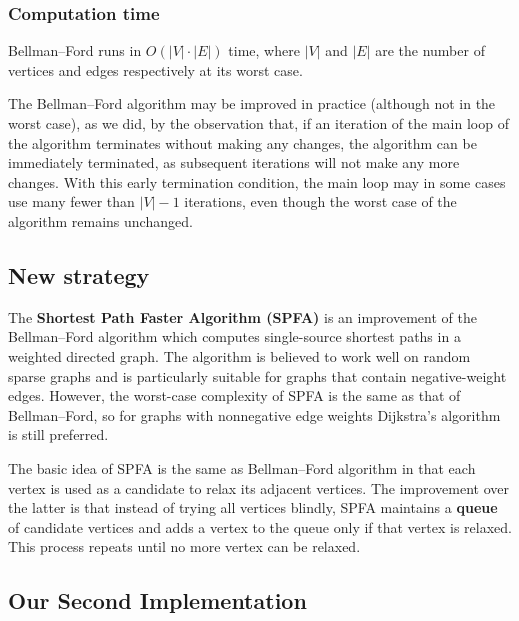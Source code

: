 \documentclass[11pt]{article}
\begin{document}
    \hypertarget{computation-time}{%
\subsubsection{Computation time}\label{computation-time}}

Bellman--Ford runs in \(O(|V|\cdot |E|)\) time, where \(|V|\) and
\(|E|\) are the number of vertices and edges respectively at its worst
case.

    The Bellman--Ford algorithm may be improved in practice (although not in
the worst case), as we did, by the observation that, if an iteration of
the main loop of the algorithm terminates without making any changes,
the algorithm can be immediately terminated, as subsequent iterations
will not make any more changes. With this early termination condition,
the main loop may in some cases use many fewer than $|V|-1$
iterations, even though the worst case of the algorithm remains
unchanged.

    \hypertarget{new-strategy}{%
\subsection{New strategy}\label{new-strategy}}

The \textbf{Shortest Path Faster Algorithm (SPFA)}\cite{SPFA} is an improvement of
the Bellman--Ford algorithm which computes single-source shortest paths
in a weighted directed graph. The algorithm is believed to work well on
random sparse graphs and is particularly suitable for graphs that
contain negative-weight edges. However, the worst-case complexity of
SPFA is the same as that of Bellman--Ford, so for graphs with
nonnegative edge weights Dijkstra's algorithm is still preferred.

    The basic idea of SPFA is the same as Bellman--Ford algorithm in that
each vertex is used as a candidate to relax its adjacent vertices. The
improvement over the latter is that instead of trying all vertices
blindly, SPFA maintains a \textbf{queue} of candidate vertices and adds
a vertex to the queue only if that vertex is relaxed. This process
repeats until no more vertex can be relaxed.

    \hypertarget{our-second-implementation}{%
\subsection{Our Second Implementation}\label{our-second-implementation}}
\end{document}
